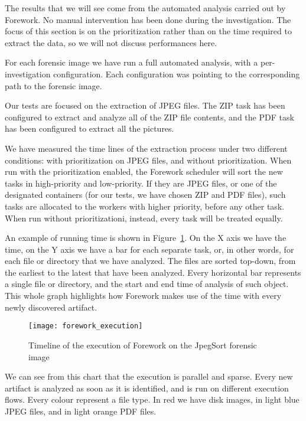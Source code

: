 \documentclass[twoside]{article}
\begin{document}
\begin{multicols}{2}
The results that we will see come from the automated analysis carried out by
Forework. No manual intervention has been done during the investigation. The
focus of this section is on the prioritization rather than on the time required
to extract the data, so we will not discuss performances here.

For each forensic image we have run a full automated analysis, with a
per-investigation configuration. Each configuration was pointing to the
corresponding path to the forensic image.

Our tests are focused on the extraction of JPEG files.
The ZIP task has been configured to extract and analyze all of the ZIP file
contents, and the PDF task has been configured to extract all the pictures.

We have measured the time lines of the extraction process under two different
conditions: with prioritization on JPEG files, and without prioritization.
When run with the prioritization enabled, the Forework scheduler will sort the
new tasks in high-priority and low-priority. If they are JPEG files, or one of
the designated containers (for our tests, we have chosen ZIP and PDF files),
such tasks are allocated to the workers with higher priority, before any other
task.
When run without prioritizationi, instead, every task will be treated equally.

An example of running time is shown in Figure~\ref{fig:forework_execution}.
On the X axis we have the time, on the Y axis we have a bar for each separate
task, or, in other words, for each file or directory that we have analyzed. The
files are sorted top-down, from the earliest to the latest that have been
analyzed.
Every horizontal bar represents a single file or directory, and the start and end
time of analysis of such object. This whole graph highlights how Forework makes
use of the time with every newly discovered artifact.

\begin{figure}[H]
    \centering
    \texttt{[image: forework\_execution]}
    \caption{Timeline of the execution of Forework on the JpegSort forensic image}
    \label{fig:forework_execution}
\end{figure}

We can see from this chart that the execution is parallel and sparse. Every new
artifact is analyzed as soon as it is identified, and is run on different
execution flows. Every colour represent a file type. In red we have disk images,
in light blue JPEG files, and in light orange PDF files.


\end{multicols}
\end{document}
